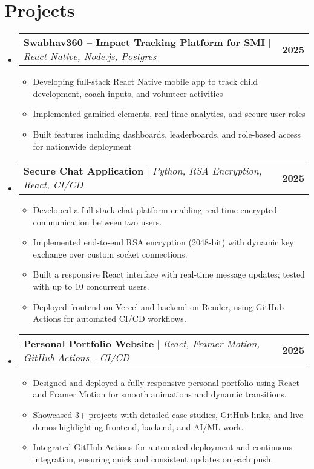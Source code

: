 \documentclass[letterpaper,11pt]{article}
\makeatletter
\newcommand{\resumeItem}[1]{
  \item\small{
    {#1 \vspace{-2pt}}
  }
}
\newcommand{\resumeProjectHeading}[2]{
    \item
    \begin{tabular*}{1.001\textwidth}{l@{\extracolsep{\fill}}r}
      \small#1 & \textbf{\small #2}\\
    \end{tabular*}\vspace{-7pt}
}
\newcommand{\resumeSubHeadingListStart}{\begin{itemize}[leftmargin=0.0in, label={}]}
\newcommand{\resumeSubHeadingListEnd}{\end{itemize}}
\newcommand{\resumeItemListStart}{\begin{itemize}}
\newcommand{\resumeItemListEnd}{\end{itemize}\vspace{-5pt}}
\makeatother
\begin{document}
\section{Projects}
    \vspace{-5pt}
    \resumeSubHeadingListStart
      \resumeProjectHeading
          {\textbf{Swabhav360 -- Impact Tracking Platform for SMI} $|$ \emph{React Native, Node.js, Postgres}}{2025}
          \resumeItemListStart
            \resumeItem{Developing full-stack React Native mobile app to track child development, coach inputs, and volunteer activities}
            \resumeItem{Implemented gamified elements, real-time analytics, and secure user roles}
            \resumeItem{Built features including dashboards, leaderboards, and role-based access for nationwide deployment}
          \resumeItemListEnd
          \vspace{-13pt}
      \resumeProjectHeading
          {\textbf{Secure Chat Application} $|$ \emph{Python, RSA Encryption, React, CI/CD}}{2025}
          \resumeItemListStart
            \resumeItem{Developed a full-stack chat platform enabling real-time encrypted communication between two users.}
            \resumeItem{Implemented end-to-end RSA encryption (2048-bit) with dynamic key exchange over custom socket connections.}
            \resumeItem{Built a responsive React interface with real-time message updates; tested with up to 10 concurrent users.}
            \resumeItem{Deployed frontend on Vercel and backend on Render, using GitHub Actions for automated CI/CD workflows.}
          \resumeItemListEnd 
          \vspace{-13pt}
      \resumeProjectHeading
          {\textbf{Personal Portfolio Website} $|$ \emph{React, Framer Motion, GitHub Actions - CI/CD}}{2025}
          \resumeItemListStart
            \resumeItem{Designed and deployed a fully responsive personal portfolio using React and Framer Motion for smooth animations and dynamic transitions.}
            \resumeItem{Showcased 3+ projects with detailed case studies, GitHub links, and live demos highlighting frontend, backend, and AI/ML work.}
            \resumeItem{Integrated GitHub Actions for automated deployment and continuous integration, ensuring quick and consistent updates on each push.}
          \resumeItemListEnd
    \resumeSubHeadingListEnd
\vspace{-15pt}

\end{document}
